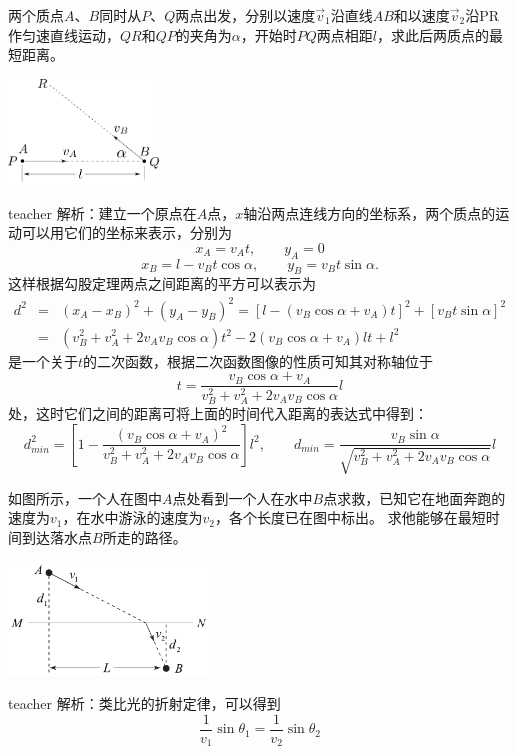 \begin{example}
两个质点$A$、$B$同时从$P$、$Q$两点出发，分别以速度$\vec{v}_{1}$沿直线$AB$和以速度$\vec{v}_2$沿PR作匀速直线运动，$QR$和$QP$的夹角为$\alpha$，开始时$PQ$两点相距$l$，求此后两质点的最短距离。
\begin{flushright}
\includegraphics[width = 0.3\textwidth]{images/motion-problem-29.pdf}  
\end{flushright}
\begin{taggedblock}{teacher}
\noindent
解析：建立一个原点在$A$点，$x$轴沿两点连线方向的坐标系，两个质点的运动可以用它们的坐标来表示，分别为
\[x_A = v_At,\qquad y_A = 0\]
\[x_B = l-v_B t\cos\alpha,\qquad y_B = v_Bt\sin\alpha.\]
这样根据勾股定理两点之间距离的平方可以表示为
\begin{eqnarray*}
d^2& =& (x_A-x_B)^2+(y_A-y_B)^2 = [l-(v_B\cos\alpha+v_A)t]^2+[v_Bt\sin\alpha]^2\\
&=& (v_B^2+v_A^2+2v_Av_B\cos\alpha)t^2-2(v_B\cos\alpha+v_A)lt+l^2
\end{eqnarray*}
是一个关于$t$的二次函数，根据二次函数图像的性质可知其对称轴位于
\[
t = \frac{v_B\cos\alpha+v_A}{v_B^2+v_A^2+2v_Av_B\cos\alpha}l
\]
处，这时它们之间的距离可将上面的时间代入距离的表达式中得到：
\[
d_{min}^2 = \left[1-\frac{(v_B\cos\alpha+v_A)^2}{v_B^2+v_A^2+2v_Av_B\cos\alpha}\right]l^2,\qquad d_{min} = \frac{v_B\sin\alpha}{\sqrt{v_B^2+v_A^2+2v_Av_B\cos\alpha}}l
\]


\end{taggedblock}
\end{example}


\begin{example}
如图所示，一个人在图中$A$点处看到一个人在水中$B$点求救，已知它在地面奔跑的速度为$v_1$，在水中游泳的速度为$v_2$，各个长度已在图中标出。
求他能够在最短时间到达落水点$B$所走的路径。
\begin{flushright}
\includegraphics[width = 0.4\textwidth]{images/motion-31.pdf} 
\end{flushright}
\begin{taggedblock}{teacher}
\vspace*{2cm}
\noindent
解析：类比光的折射定律，可以得到
\[
\frac{1}{v_1}\sin\theta_1 = \frac{1}{v_2}\sin\theta_2
\]
\end{taggedblock}
\end{example}

